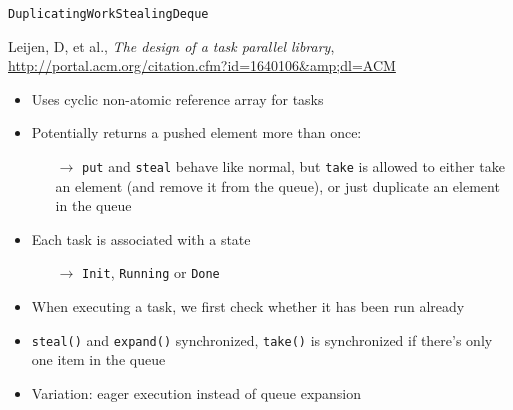 \begin{frame}{\lstinline!DuplicatingWorkStealingDeque!}
  \begin{thebibliography}{10}
    \beamertemplatearticlebibitems
    
    Leijen, D, et al., {\em The design of a task parallel library},
    \url{http://portal.acm.org/citation.cfm?id=1640106&amp;dl=ACM}
  \end{thebibliography}


  \begin{itemize}
  \item Uses cyclic non-atomic reference array for tasks
  \item Potentially returns a pushed element more than once:
    \begin{itemize}
    \item[$\rightarrow$] \lstinline!put! and \lstinline!steal! behave
      like normal, but \lstinline!take! is allowed to either take an
      element (and remove it from the queue), or just duplicate an
      element in the queue
    \end{itemize}
  \item Each task is associated with a state
    \begin{itemize}
    \item [$\rightarrow$] \lstinline!Init!, \lstinline!Running! or
      \lstinline!Done!
    \end{itemize}
  \item When executing a task, we first check whether it has been run
    already
  \item \lstinline!steal()! and \lstinline!expand()! synchronized,
    \lstinline!take()! is synchronized if there's only one item in the
    queue
  \item Variation: eager execution instead of queue expansion
  \end{itemize}
\end{frame}

